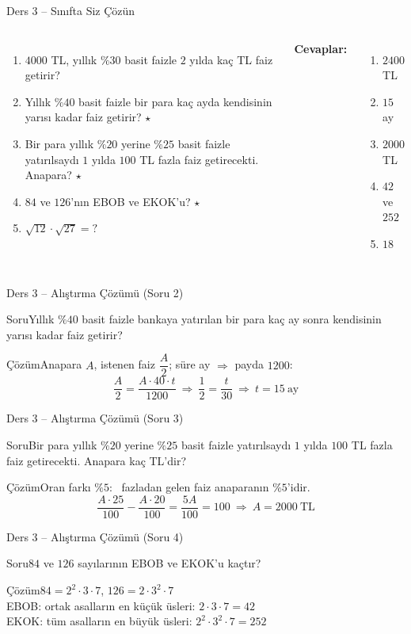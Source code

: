 \documentclass[aspectratio=169,11pt,handout]{beamer}
\newcommand{\soru}[3]{%
\begin{frame}{#1}
  \begin{block}{Soru}\large #2\end{block}
  \pause
  \begin{exampleblock}{Çözüm}\large #3\end{exampleblock}
\end{frame}}
\begin{document}
\begin{frame}{Ders 3 -- Sınıfta Siz Çözün}
\begin{columns}[t]
\begin{enumerate}
\item \(4000\) TL, yıllık \(\%30\) basit faizle \(2\) yılda kaç TL faiz getirir?
\item Yıllık \(\%40\) basit faizle bir para kaç ayda kendisinin yarısı kadar faiz getirir? \(\star\)
\item Bir para yıllık \(\%20\) yerine \(\%25\) basit faizle yatırılsaydı \(1\) yılda \(100\) TL fazla faiz getirecekti. Anapara? \(\star\)
\item \(84\) ve \(126\)'nın EBOB ve EKOK'u? \(\star\)
\item \(\sqrt{12}\cdot\sqrt{27}=?\)
\end{enumerate}
\pause
\textbf{Cevaplar:}
\begin{enumerate}
\item \(2400\) TL
\item \(15\) ay
\item \(2000\) TL
\item \(42\) ve \(252\)
\item \(18\)
\end{enumerate}
\end{columns}
\vspace{4pt}{\footnotesize \(\star\) işaretli soruların adım adım çözümü sonraki slaytlardadır.}
\end{frame}

\soru{Ders 3 -- Alıştırma Çözümü (Soru 2)}
{Yıllık \(\%40\) basit faizle bankaya yatırılan bir para kaç ay sonra kendisinin yarısı kadar faiz getirir?}
{Anapara \(A\), istenen faiz \(\dfrac{A}{2}\); süre ay \(\Rightarrow\) payda \(1200\):
\[\frac{A}{2}=\frac{A\cdot 40\cdot t}{1200}\ \Rightarrow\ \frac{1}{2}=\frac{t}{30}\ \Rightarrow\ t=15\ \text{ay}\]}

\soru{Ders 3 -- Alıştırma Çözümü (Soru 3)}
{Bir para yıllık \(\%20\) yerine \(\%25\) basit faizle yatırılsaydı \(1\) yılda \(100\) TL fazla faiz getirecekti. Anapara kaç TL'dir?}
{Oran farkı \(\%5\): \ fazladan gelen faiz anaparanın \(\%5\)'idir.
\[\frac{A\cdot 25}{100}-\frac{A\cdot 20}{100}=\frac{5A}{100}=100\ \Rightarrow\ A=2000\ \text{TL}\]}

\soru{Ders 3 -- Alıştırma Çözümü (Soru 4)}
{\(84\) ve \(126\) sayılarının EBOB ve EKOK'u kaçtır?}
{\(84=2^2\cdot 3\cdot 7\), \qquad \(126=2\cdot 3^2\cdot 7\)\\[3pt]
EBOB: ortak asalların en küçük üsleri: \(2\cdot 3\cdot 7=42\)\\[3pt]
EKOK: tüm asalların en büyük üsleri: \(2^2\cdot 3^2\cdot 7=252\)}
\end{document}
